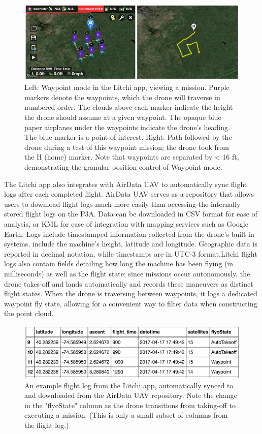 \documentclass[pageno]{jpaper}
\begin{document}
\begin{figure}[h]
	\caption{Left: Waypoint mode in the Litchi app, viewing a mission. Purple markers denote the waypoints, which the drone will traverse in numbered order. The clouds above each marker indicate the height the drone should assume at a given waypoint. The opaque blue paper airplanes under the waypoints indicate the drone's heading. The blue marker is a point of interest. Right: Path followed by the drone during a test of this waypoint mission; the drone took from the H (home) marker. Note that waypoints are separated by < 16 ft, demonstrating the granular position control of Waypoint mode.}
	\includegraphics{waypoint}
	\centering
\end{figure}

The Litchi app also integrates with AirData UAV to automatically sync flight logs after each completed flight. AirData UAV serves as a repository that allows users to download flight logs much more easily than accessing the internally stored flight logs on the P3A. Data can be downloaded in CSV format for ease of analysis, or KML for ease of integration with mapping services such as Google Earth. Logs include timestamped information collected from the drone's built-in systems, include the machine's height, latitude and longitude. Geographic data is reported in decimal notation, while timestamps are in UTC-3 format.Litchi flight logs also contain fields detailing how long the machine has been flying (in milliseconds) as well as the flight state; since missions occur autonomously, the drone takes-off and lands automatically and records these maneuvers as distinct flight states. When the drone is traversing between waypoints, it logs a dedicated waypoint fly state, allowing for a convenient way to filter data when constructing the point cloud. 

\begin{figure}[h]
	\caption{An example flight log from the Litchi app, automatically synced to and downloaded from the AirData UAV repository. Note the change in the "flycState" column as the drone transitions from taking-off to executing a mission. (This is only a small subset of columns from the flight log.)}
	\includegraphics{flight_log}
	\centering
\end{figure}
\end{document}
